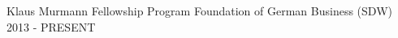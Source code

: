 \begin{cvhonors}

  \cvhonor
    {Klaus Murmann Fellowship Program} %
    {Foundation of German Business (SDW)} %
    {} %
    {2013 - PRESENT} %

\end{cvhonors}
